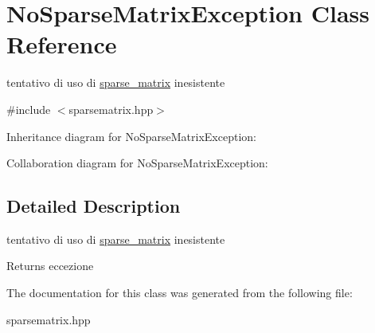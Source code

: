 \hypertarget{classNoSparseMatrixException}{}\section{No\+Sparse\+Matrix\+Exception Class Reference}
\label{classNoSparseMatrixException}


tentativo di uso di \hyperlink{classsparse__matrix}{sparse\+\_\+matrix} inesistente  




{\ttfamily \#include $<$sparsematrix.\+hpp$>$}



Inheritance diagram for No\+Sparse\+Matrix\+Exception\+:


Collaboration diagram for No\+Sparse\+Matrix\+Exception\+:


\subsection{Detailed Description}
tentativo di uso di \hyperlink{classsparse__matrix}{sparse\+\_\+matrix} inesistente 

\begin{DoxyReturn}{Returns}
eccezione 
\end{DoxyReturn}


The documentation for this class was generated from the following file\+:\begin{DoxyCompactItemize}
\item 
sparsematrix.\+hpp\end{DoxyCompactItemize}
